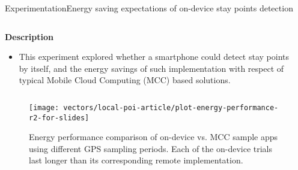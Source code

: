 \begin{frame}{Experimentation}{Energy saving expectations of on-device stay points detection}
\small
\begin{columns}
\begin{column}{0.55\textwidth}
\begin{block}{\small \textbf{Description}}
\begin{itemize}
  \item This experiment explored whether a smartphone could detect stay points by itself, and the energy savings of such implementation with respect of typical Mobile Cloud Computing (MCC) based solutions.
\end{itemize}
\end{block}
\end{column}

\begin{column}{0.4\textwidth}
\begin{table}
\centering
\renewcommand{\arraystretch}{0.8}
\caption{Input parameters for the energy saving expectations of on-device stay points detection experiment.}
\label{tab:exp-energy-performance-input-parameters}
\end{table}
\end{column}
\end{columns}

\begin{figure}
  \centering
  \texttt{[image: vectors/local-poi-article/plot-energy-performance-r2-for-slides]}
  \caption{Energy performance comparison of on-device vs. MCC sample apps using different GPS sampling periods. Each of the on-device trials last longer than its corresponding remote implementation.}
\end{figure}

\end{frame}


